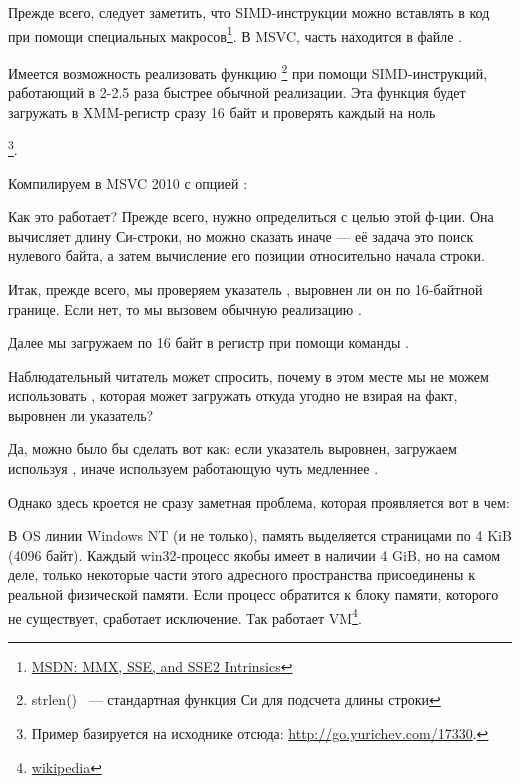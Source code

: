 ﻿
\label{SIMD_strlen}

\newcommand{\URLMSDNSSE}{\href{http://go.yurichev.com/17262}{MSDN: MMX, SSE, and SSE2 Intrinsics}}

Прежде всего, следует заметить, что SIMD-инструкции можно вставлять в \CCpp код при помощи специальных 
макросов\footnote{\URLMSDNSSE}. В MSVC, часть находится в файле .

\newcommand{\URLSTRLEN}{http://go.yurichev.com/17330}

Имеется возможность реализовать функцию \strlen\footnote{strlen() ~--- стандартная функция Си 
для подсчета длины строки} при помощи SIMD-инструкций, работающий в 2-2.5 раза быстрее обычной реализации. 
Эта функция будет загружать в XMM-регистр сразу 16 байт и проверять каждый на ноль

\footnote{Пример базируется на исходнике отсюда: \url{\URLSTRLEN}.}.



Компилируем в MSVC 2010 с опцией \Ox:



Как это работает?
Прежде всего, нужно определиться с целью этой ф-ции.
Она вычисляет длину Си-строки, но можно сказать иначе --- её задача это поиск нулевого байта, а затем вычисление его позиции относительно начала строки.

Итак, прежде всего, мы проверяем указатель , выровнен ли он по 16-байтной границе. 
Если нет, то мы вызовем обычную реализацию \strlen.

Далее мы загружаем по 16 байт в регистр  при помощи команды \MOVDQA.

Наблюдательный читатель может спросить, почему в этом месте мы не можем использовать \MOVDQU, 
которая может загружать откуда угодно не взирая на факт, выровнен ли указатель?

Да, можно было бы сделать вот как: если указатель выровнен, загружаем используя \MOVDQA, 
иначе используем работающую чуть медленнее \MOVDQU.

Однако здесь кроется не сразу заметная проблема, которая проявляется вот в чем:

\newcommand{\URLPAGE}{\href{http://go.yurichev.com/17136}{wikipedia}}

В \ac{OS} линии \gls{Windows NT} (и не только), память выделяется страницами по 4 KiB (4096 байт). 
Каждый win32-процесс якобы имеет в наличии 4 GiB, но на самом деле, 
только некоторые части этого адресного пространства присоединены к реальной физической памяти. 
Если процесс обратится к блоку памяти, которого не существует, сработает исключение. 
Так работает \ac{VM}\footnote{\URLPAGE}.

